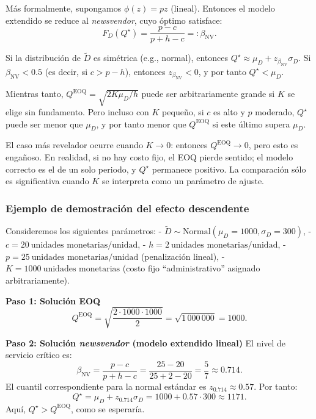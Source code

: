 \documentclass[
  spanish,
  us-letterpaper,
  DIV=11,
  numbers=noendperiod]{scrreprt}
\numberwithin{equation}{section}
\begin{document}
Más formalmente, supongamos \(\phi(z) = p z\) (lineal). Entonces el
modelo extendido se reduce al \emph{newsvendor}, cuyo óptimo satisface:
\[
F_D(Q^\star) = \frac{p - c}{p + h - c} =: \beta_{\text{NV}}.
\]

Si la distribución de \(\tilde{D}\) es simétrica (e.g., normal),
entonces \(Q^\star \approx \mu_D + z_{\beta_{\text{NV}}} \sigma_D\). Si
\(\beta_{\text{NV}} < 0.5\) (es decir, si \(c > p - h\)), entonces
\(z_{\beta_{\text{NV}}} < 0\), y por tanto \(Q^\star < \mu_D\).

Mientras tanto, \(Q^{\text{EOQ}} = \sqrt{2 K \mu_D / h}\) puede ser
arbitrariamente grande si \(K\) se elige sin fundamento. Pero incluso
con \(K\) pequeño, si \(c\) es alto y \(p\) moderado, \(Q^\star\) puede
ser menor que \(\mu_D\), y por tanto menor que \(Q^{\text{EOQ}}\) si
este último supera \(\mu_D\).

El caso más revelador ocurre cuando \textbf{\(K \to 0\)}: entonces
\(Q^{\text{EOQ}} \to 0\), pero esto es engañoso. En realidad, si no hay
costo fijo, el EOQ pierde sentido; el modelo correcto es el de un solo
periodo, y \(Q^\star\) permanece positivo. La comparación sólo es
significativa cuando \(K\) se interpreta como un parámetro de ajuste.

\subsubsection{Ejemplo de demostración del efecto
descendente}\label{ejemplo-de-demostraciuxf3n-del-efecto-descendente}

Consideremos los siguientes parámetros: -
\(\tilde{D} \sim \text{Normal}(\mu_D = 1000, \sigma_D = 300)\), -
\(c = 20~\text{unidades monetarias/unidad}\), -
\(h = 2~\text{unidades monetarias/unidad}\), -
\(p = 25~\text{unidades monetarias/unidad}\) (penalización lineal), -
\(K = 1000~\text{unidades monetarias}\) (costo fijo ``administrativo''
asignado arbitrariamente).

\textbf{Paso 1: Solución EOQ} \[
Q^{\text{EOQ}} = \sqrt{\frac{2 \cdot 1000 \cdot 1000}{2}} = \sqrt{1\,000\,000} = 1000.
\]

\textbf{Paso 2: Solución \emph{newsvendor} (modelo extendido lineal)} El
nivel de servicio crítico es: \[
\beta_{\text{NV}} = \frac{p - c}{p + h - c} = \frac{25 - 20}{25 + 2 - 20} = \frac{5}{7} \approx 0.714.
\] El cuantil correspondiente para la normal estándar es
\(z_{0.714} \approx 0.57\). Por tanto: \[
Q^\star = \mu_D + z_{0.714} \sigma_D = 1000 + 0.57 \cdot 300 \approx 1171.
\] Aquí, \(Q^\star > Q^{\text{EOQ}}\), como se esperaría.
\end{document}
